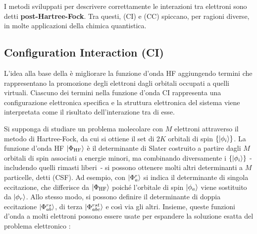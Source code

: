 I metodi sviluppati per descrivere correttamente le interazioni tra elettroni sono detti \textbf{post-Hartree-Fock}. Tra questi,  (CI) e  (CC) spiccano, per ragioni diverse, in molte applicazioni della chimica quantistica.

\subsection{Configuration Interaction (CI)}\label{subsec:configuration-interaction}

L'idea alla base della  è migliorare la funzione d’onda HF aggiungendo termini che rappresentano la promozione degli elettroni dagli orbitali occupati a quelli virtuali. Ciascuno dei termini nella funzione d'onda CI rappresenta una configurazione elettronica specifica e la struttura elettronica del sistema viene interpretata come il risultato dell’interazione tra di esse.

Si supponga di studiare un problema molecolare con $M$ elettroni attraverso il metodo di Hartree-Fock, da cui si ottiene il set di $2K$ orbitali di spin $\{\ket{\phi_i}\}$. La funzione d'onda HF $\ket{\Phi_{\text{HF}}}$ è il determinante di Slater costruito a partire dagli $M$ orbitali di spin associati a energie minori, ma combinando diversamente i $\{\ket{\phi_i}\}$ - includendo quelli rimasti liberi~- si possono ottenere molti altri determinanti a $M$ particelle, detti  (CSF). 
Ad esempio, con $\ket{\Phi_{a}^{r}}$ si indica il determinante di singola eccitazione, che differisce da $\ket{\Phi_{\text{HF}}}$ poiché l'orbitale di spin $\ket{\phi_a}$ viene sostituito da $\ket{\phi_r}$. Allo stesso modo, si possono definire il determinante di doppia eccitazione $\ket{\Phi_{ab}^{rs}}$, di terza $\ket{\Phi_{abc}^{rst}}$ e così via gli altri.
Insieme, queste funzioni d'onda a molti elettroni possono essere usate per espandere la soluzione esatta del problema elettronico \cite{computational_chem}:


